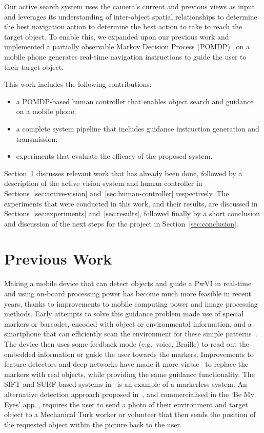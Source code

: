 \documentclass[runningheads]{llncs}
\begin{document}
Our active search system uses the camera's current and previous views as input and leverages its understanding of inter-object spatial relationships to determine the best navigation action to determine the best action to take to reach the target object.
To enable this, we expanded upon our previous work and implemented a partially observable Markov Decision Process (POMDP)~\cite{bellman1957markovian} on a mobile phone generates real-time navigation instructions to guide the user to their target object.

This work includes the following contributions:

\begin{itemize}
  \item a POMDP-based human controller that enables object search and guidance on a mobile phone;
  \item a complete system pipeline that includes guidance instruction generation and transmission;
  \item experiments that evaluate the efficacy of the proposed system.
\end{itemize}

Section~\ref{sec:previous-work} discusses relevant work that has already been done, followed by a description of the active vision system and human controller in Sections~\ref{sec:active-vision} and~\ref{sec:human-controller} respectively. 
The experiments that were conducted in this work, and their results, are discussed in Sections~\ref{sec:experiments} and~\ref{sec:results}, followed finally by a short conclusion and discussion of the next steps for the project in Section~\ref{sec:conclusion}.

\section{Previous Work}\label{sec:previous-work}

Making a mobile device that can detect objects and guide a PwVI in real-time and using on-board processing power has become much more feasible in recent years, thanks to improvements to mobile computing power and image processing methods.
Early attempts to solve this guidance problem made use of special markers or barcodes, encoded with object or environmental information, and a smartphone that can efficiently scan the environment for these simple patterns~\cite{gude2013blind,iannizzotto2005badge3d,manduchi2012mobile}. 
The device then uses some feedback mode (e.g.\ voice, Braille) to read out the embedded information or guide the user towards the markers. 
Improvements to feature detectors and deep networks have made it more viable~\cite{redmon2016you,huang2017speed} to replace the markers with real objects, while providing the same guidance functionality.
The SIFT and SURF-based systems in~\cite{schauerte2012assistive} is an example of a markerless system.
An alternative detection approach proposed in~\cite{bigham2010vizwiz}, and commercialised in the `Be My Eyes' app~\cite{bemyeyes2019}, requires the user to send a photo of their environment and target object to a Mechanical Turk worker or volunteer that then sends the position of the requested object within the picture back to the user. 
\end{document}

